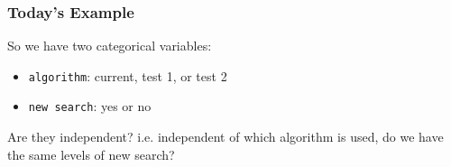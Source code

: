 \documentclass[handout]{beamer}
\newcommand{\blue}[1]{\textcolor{blue2}{#1}}
\newcommand{\white}[1]{\textcolor{white}{#1}}
\begin{document}
\begin{frame}
\frametitle{Today's Example}
So we have two categorical variables:
\begin{itemize}
\item {\tt algorithm}: current, test 1, or test 2
\item {\tt new search}: yes or no
\end{itemize}

\vspace{0.25cm}

\pause Are they independent?  i.e. independent of which algorithm is used, do we have the same levels of new search?


\end{frame}


%
%
%
%
\end{document}
